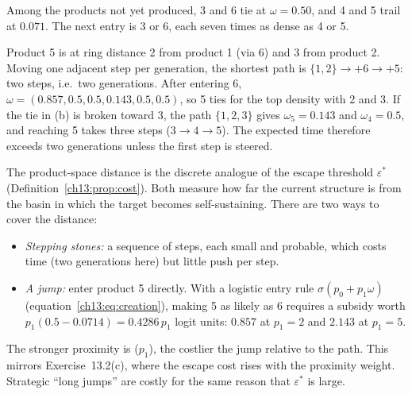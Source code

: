 \documentclass[../solutions_manual.tex]{subfiles}
\begin{document}
 Among the products not yet produced, 3 and 6 tie at $\omega = 0.50$, and 4 and 5 trail at $0.071$. The next entry is 3 or 6, each seven times as dense as 4 or 5.

 Product 5 is at ring distance 2 from product 1 (via 6) and 3 from product 2. Moving one adjacent step per generation, the shortest path is $\{1,2\} \to +6 \to +5$: two steps, i.e.\ two generations. After entering 6, $\omega = (0.857, 0.5, 0.5, 0.143, 0.5, 0.5)$, so 5 ties for the top density with 2 and 3. If the tie in (b) is broken toward 3, the path $\{1,2,3\}$ gives $\omega_5 = 0.143$ and $\omega_4 = 0.5$, and reaching 5 takes three steps ($3 \to 4 \to 5$). The expected time therefore exceeds two generations unless the first step is steered.

 The product-space distance is the discrete analogue of the escape threshold $\varepsilon^*$ (Definition~\ref{ch13:prop:cost}). Both measure how far the current structure is from the basin in which the target becomes self-sustaining. There are two ways to cover the distance:
\begin{itemize}
\item \emph{Stepping stones:} a sequence of steps, each small and probable, which costs time (two generations here) but little push per step.
\item \emph{A jump:} enter product 5 directly. With a logistic entry rule $\sigma(p_0 + p_1\omega)$ (equation~\eqref{ch13:eq:creation}), making 5 as likely as 6 requires a subsidy worth $p_1(0.5 - 0.0714) = 0.4286\,p_1$ logit units: $0.857$ at $p_1 = 2$ and $2.143$ at $p_1 = 5$.
\end{itemize}
The stronger proximity is ($p_1$), the costlier the jump relative to the path. This mirrors Exercise~13.2(c), where the escape cost rises with the proximity weight. Strategic ``long jumps'' are costly for the same reason that $\varepsilon^*$ is large.
\end{document}
